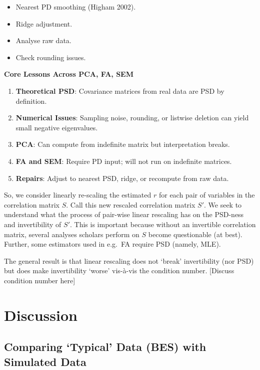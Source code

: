 \documentclass[
  12pt,
]{article}
\providecommand{\tightlist}{%
  \setlength{\itemsep}{0pt}\setlength{\parskip}{0pt}}
\theoremstyle{plain}
\theoremstyle{definition}
\theoremstyle{remark}
\begin{document}
\begin{itemize}
\tightlist
\item
  Nearest PD smoothing (Higham 2002).
\item
  Ridge adjustment.
\item
  Analyse raw data.
\item
  Check rounding issues.
\end{itemize}

\textbf{Core Lessons Across PCA, FA, SEM}

\begin{enumerate}
\def\labelenumi{\arabic{enumi}.}
\tightlist
\item
  \textbf{Theoretical PSD}: Covariance matrices from real data are PSD
  by definition.
\item
  \textbf{Numerical Issues}: Sampling noise, rounding, or listwise
  deletion can yield small negative eigenvalues.
\item
  \textbf{PCA}: Can compute from indefinite matrix but interpretation
  breaks.
\item
  \textbf{FA and SEM}: Require PD input; will not run on indefinite
  matrices.
\item
  \textbf{Repairs}: Adjust to nearest PSD, ridge, or recompute from raw
  data.
\end{enumerate}

So, we consider linearly re-scaling the estimated \(r\) for each pair of
variables in the correlation matrix \(S\). Call this new rescaled
correlation matrix \(S'\). We seek to understand what the process of
pair-wise linear rescaling has on the PSD-ness and invertibility of
\(S'\). This is important because without an invertible correlation
matrix, several analyses scholars perform on \(S\) become questionable
(at best). Further, some estimators used in e.g.~FA require PSD (namely,
MLE).

The general result is that linear rescaling does not `break'
invertibility (nor PSD) but does make invertibility `worse' vis-à-vis
the condition number. {[}Discuss condition number here{]}

\section{Discussion}\label{discussion}

\subsection{Comparing `Typical' Data (BES) with Simulated
Data}\label{comparing-typical-data-bes-with-simulated-data}
\end{document}
